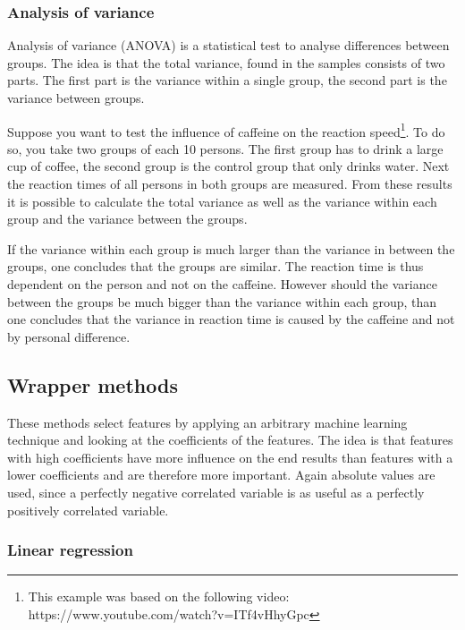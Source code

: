 \subsubsection{Analysis of variance}

Analysis of variance (ANOVA) is a statistical test to analyse differences between groups. The idea is that the total variance, found in the samples consists of two parts. The first part is the variance within a single group, the second part is the variance between groups. 

\npar

Suppose you want to test the influence of caffeine on the reaction speed\footnote{This example was based on the following video: https://www.youtube.com/watch?v=ITf4vHhyGpc}. To do so, you take two groups of each 10 persons. The first group has to drink a large cup of coffee, the second group is the control group that only drinks water. Next the reaction times of all persons in both groups are measured. From these results it is possible to calculate the total variance as well as the variance within each group and the variance between the groups. 

\npar

If the variance within each group is much larger than the variance in between the groups, one concludes that the groups are similar. The reaction time is thus dependent on the person and not on the caffeine. However should the variance between the groups be much bigger than the variance within each group, than one concludes that the variance in reaction time is caused by the caffeine and not by personal difference.

\subsection{Wrapper methods}
These methods select features by applying an arbitrary machine learning technique and looking at the coefficients of the features. The idea is that features with high coefficients have more influence on the end results than features with a lower coefficients and are therefore more important. Again absolute values are used, since a perfectly negative correlated variable is as useful as a perfectly positively correlated variable.

\subsubsection{Linear regression}

